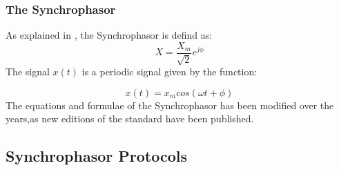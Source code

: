 \subsubsection{The Synchrophasor}

    As explained in \Cite{schofield2018design}, the Synchrophasor is defind as:
\begin{equation}
    X=\frac{X_m}{\sqrt{2}}e^{j\phi}
\end{equation}
 The signal $x(t)$ is a periodic signal given by the function:


 
  \begin{equation}
      x(t) = x_mcos(\omega t + \phi )
  \end{equation}
The equations and formulae of the Synchrophasor has been modified over the years,as new editions of the standard have been published. 

\subsection{Synchrophasor Protocols}





